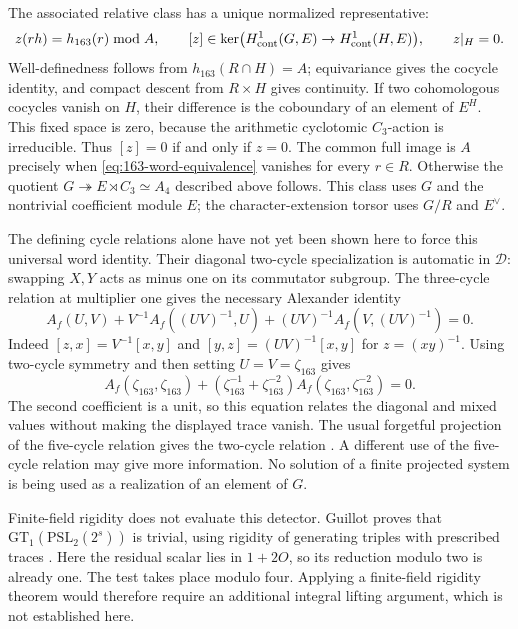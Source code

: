 The associated relative class has a unique normalized
representative:
\begin{equation}
 z(rh)=h_{163}(r)\bmod A,\qquad
 [z]\in\ker\bigl(H^1_{\rm cont}(G,E)\to
                         H^1_{\rm cont}(H,E)\bigr),\qquad z|_H=0.
 \label{eq:163-relative-twisted-class}
\end{equation}
Well-definedness follows from \(h_{163}(R\cap H)=A\);
equivariance gives the cocycle identity, and compact descent
from \(R\times H\) gives continuity.
If two cohomologous cocycles vanish on \(H\), their difference
is the coboundary of an element of \(E^H\). This fixed space
is zero, because the arithmetic cyclotomic \(C_3\)-action
is irreducible. Thus \([z]=0\) if and only if \(z=0\).
The common full image is \(A\) precisely when
\eqref{eq:163-word-equivalence} vanishes for every \(r\in R\).
Otherwise the quotient \(G\twoheadrightarrow E\rtimes C_3\simeq A_4\)
described above follows. This class uses \(G\) and the nontrivial
coefficient module \(E\); the character-extension torsor uses
\(G/R\) and \(E^\vee\).

The defining cycle relations alone have not yet been shown here
to force this universal word identity. Their diagonal
two-cycle specialization is automatic in \(\mathscr D\):
swapping \(X,Y\) acts as minus one on its commutator subgroup.
The three-cycle relation at multiplier one gives the necessary
Alexander identity
\[
 A_f(U,V)+V^{-1}A_f((UV)^{-1},U)
       +(UV)^{-1}A_f(V,(UV)^{-1})=0.
\]
Indeed \([z,x]=V^{-1}[x,y]\) and
\([y,z]=(UV)^{-1}[x,y]\) for \(z=(xy)^{-1}\).
Using two-cycle symmetry and then setting \(U=V=\zeta_{163}\)
gives
\[
 A_f(\zeta_{163},\zeta_{163})
   +(\zeta_{163}^{-1}+\zeta_{163}^{-2})
                 A_f(\zeta_{163},\zeta_{163}^{-2})=0.
\]
The second coefficient is a unit, so this equation relates
the diagonal and mixed values without making the displayed
trace vanish. The usual forgetful projection of the five-cycle
relation gives the two-cycle relation
\cite[Section~1, Proposition~1.3]{Furusho2003}.
A different use of the five-cycle relation may give more
information. No solution of a finite projected system is
being used as a realization of an element of \(G\).

Finite-field rigidity does not evaluate this detector. Guillot proves
that \(\mathrm{GT}_1(\mathrm{PSL}_2(2^s))\) is trivial, using
rigidity of generating triples with prescribed traces
\cite[Theorem~1.1, Proposition~3.2 and Corollary~3.3, pp.~1--3]{Guillot2016}.
Here the residual scalar lies in \(1+2O\), so its reduction modulo
two is already one. The test takes place modulo four. Applying
a finite-field rigidity theorem would therefore require an additional
integral lifting argument, which is not established here.

